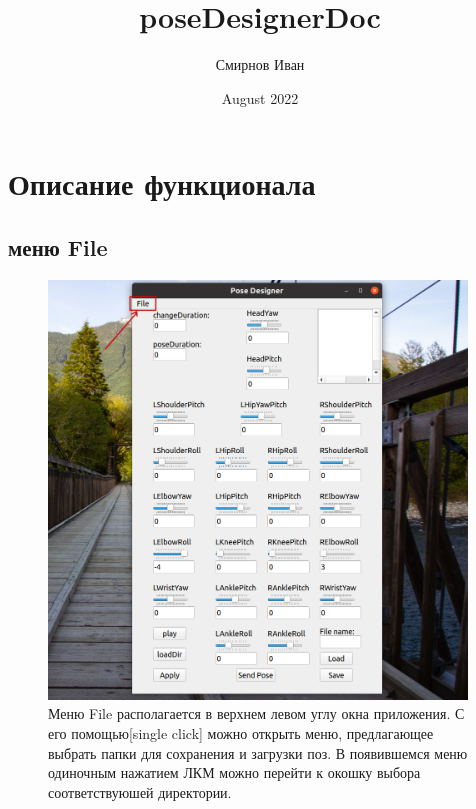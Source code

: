 \documentclass[12pt,a4paper]{article}
\title{poseDesignerDoc}
\author{Смирнов Иван }
\date{August 2022}
\begin{document}
\tableofcontents
\newpage

\section{Описание функционала}
\subsection{меню File}
\label{file}
\begin{figure}[h!]
    \centering
    \includegraphics[width=0.99\textwidth]{images/file.png}
    \caption{Меню File располагается в верхнем левом углу окна приложения. С его помощью[single click] можно открыть меню, предлагающее выбрать папки для сохранения и загрузки поз. В появившемся меню одиночным нажатием ЛКМ можно перейти к окошку выбора соответствуюшей директории.}
    \label{fig:file}
\end{figure}
\newpage
\end{document}
